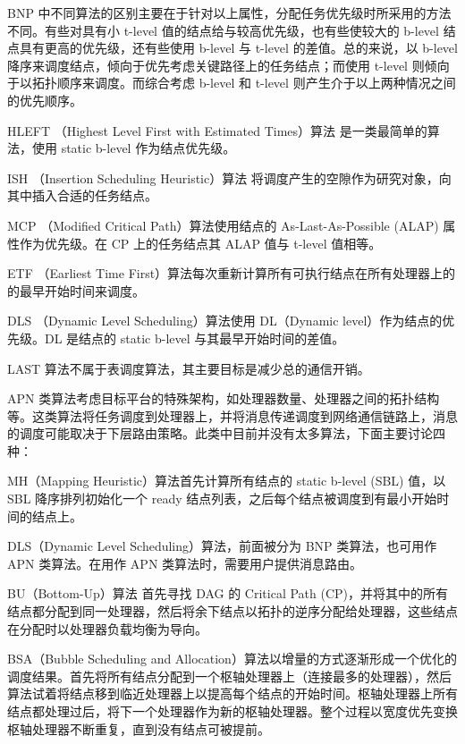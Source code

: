 BNP 中不同算法的区别主要在于针对以上属性，分配任务优先级时所采用的方法不同。有些对具有小 t-level 值的结点给与较高优先级，也有些使较大的 b-level 结点具有更高的优先级，还有些使用 b-level 与 t-level 的差值。总的来说，以 b-level 降序来调度结点，倾向于优先考虑关键路径上的任务结点；而使用 t-level 则倾向于以拓扑顺序来调度。而综合考虑 b-level 和 t-level 则产生介于以上两种情况之间的优先顺序。

    HLEFT （Highest Level First with Estimated Times）算法 是一类最简单的算法，使用 static b-level 作为结点优先级。

    ISH （Insertion Scheduling Heuristic）算法 将调度产生的空隙作为研究对象，向其中插入合适的任务结点。

    MCP （Modified Critical Path）算法使用结点的 As-Last-As-Possible (ALAP) 属性作为优先级。在 CP 上的任务结点其 ALAP 值与 t-level 值相等。

    ETF （Earliest Time First）算法每次重新计算所有可执行结点在所有处理器上的的最早开始时间来调度。

    DLS （Dynamic Level Scheduling）算法使用 DL（Dynamic level）作为结点的优先级。DL 是结点的 static b-level 与其最早开始时间的差值。

    LAST 算法不属于表调度算法，其主要目标是减少总的通信开销。


APN 类算法考虑目标平台的特殊架构，如处理器数量、处理器之间的拓扑结构等。这类算法将任务调度到处理器上，并将消息传递调度到网络通信链路上，消息的调度可能取决于下层路由策略。此类中目前并没有太多算法，下面主要讨论四种：

    MH（Mapping Heuristic）算法首先计算所有结点的 static b-level (SBL) 值，以 SBL 降序排列初始化一个 ready 结点列表，之后每个结点被调度到有最小开始时间的结点上。

    DLS（Dynamic Level Scheduling）算法，前面被分为 BNP 类算法，也可用作 APN 类算法。在用作 APN 类算法时，需要用户提供消息路由。

    BU（Bottom-Up）算法 首先寻找 DAG 的 Critical Path (CP)，并将其中的所有结点都分配到同一处理器，然后将余下结点以拓扑的逆序分配给处理器，这些结点在分配时以处理器负载均衡为导向。

    BSA（Bubble Scheduling and Allocation）算法以增量的方式逐渐形成一个优化的调度结果。首先将所有结点分配到一个枢轴处理器上（连接最多的处理器），然后算法试着将结点移到临近处理器上以提高每个结点的开始时间。枢轴处理器上所有结点都处理过后，将下一个处理器作为新的枢轴处理器。整个过程以宽度优先变换枢轴处理器不断重复，直到没有结点可被提前。

